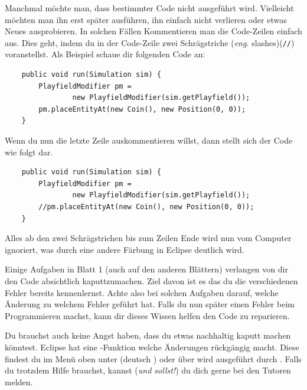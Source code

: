 \begin{Infobox}
    Manchmal möchte man, dass bestimmter Code nicht ausgeführt wird.
    Vielleicht möchten man ihn erst später ausführen, ihn einfach nicht verlieren oder etwas Neues ausprobieren.
    In solchen Fällen Kommentieren man die Code-Zeilen einfach aus.
    Dies geht, indem du in der Code-Zeile zwei Schrägstriche (\emph{eng.} slashes)(\lstinline{//}) voranstellst.
    Als Beispiel schaue dir folgenden Code an:\\

    \hfill
    \begin{minipage}{.96\textwidth}
        \begin{lstlisting}
    public void run(Simulation sim) {
        PlayfieldModifier pm =
                new PlayfieldModifier(sim.getPlayfield());
        pm.placeEntityAt(new Coin(), new Position(0, 0));
    }
        \end{lstlisting}
    \end{minipage}

    Wenn du nun die letzte Zeile auskommentieren willst, dann stellt sich der Code wie folgt dar.\\

    \hfill
    \begin{minipage}{.96\textwidth}
        \begin{lstlisting}
    public void run(Simulation sim) {
        PlayfieldModifier pm =
                new PlayfieldModifier(sim.getPlayfield());
        //pm.placeEntityAt(new Coin(), new Position(0, 0));
    }
        \end{lstlisting}
    \end{minipage}

    Alles ab den zwei Schrägstrichen bis zum Zeilen Ende wird nun vom Computer ignoriert, was durch eine andere Färbung in Eclipse deutlich wird.
\end{Infobox}


\begin{Infobox}[Fehler]
    Einige Aufgaben in Blatt 1 (auch auf den anderen Blättern) verlangen von dir den Code absichtlich kaputtzumachen.
    Ziel davon ist es das du die verschiedenen Fehler bereits kennenlernst.
    Achte also bei solchen Aufgaben darauf, welche Änderung zu welchem Fehler geführt hat.
    Falls du nun später einen Fehler beim Programmieren machst, kann dir dieses Wissen helfen den Code zu reparieren.

    Du brauchst auch keine Angst haben, dass du etwas nachhaltig kaputt machen könntest.
    Eclipse hat eine -Funktion welche Änderungen rückgängig macht.
    Diese findest du im Menü oben unter  (deutsch ) oder über wird ausgeführt durch .
    Falls du trotzdem Hilfe brauchst, kannst (\emph{und sollst!}) du dich gerne bei den Tutoren melden.
\end{Infobox}


